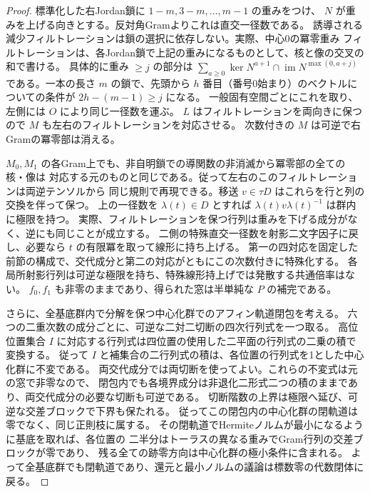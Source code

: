 \begin{proof}
標準化した右Jordan鎖に $1-m,3-m,\ldots,m-1$ の重みをつけ、
$N$ が重みを上げる向きとする。反対角Gramよりこれは直交一径数である。
誘導される減少フィルトレーションは鎖の選択に依存しない。実際、中心0の冪零重み
フィルトレーションは、各Jordan鎖で上記の重みになるものとして、核と像の交叉の和で書ける。
具体的に重み $\ge j$ の部分は $\sum_{a\ge0}\ker N^{a+1}\cap
\operatorname{im}N^{\max(0,a+j)}$ である。一本の長さ $m$ の鎖で、先頭から
$h$ 番目（番号0始まり）のベクトルについての条件が $2h-(m-1)\ge j$ になる。
一般固有空間ごとにこれを取り、左側には $O$ により同じ一径数を運ぶ。
$L$ はフィルトレーションを両向きに保つので $M$ も左右のフィルトレーションを対応させる。
次数付きの $M$ は可逆で右Gramの冪零部は消える。

$M_0,M_1$ の各Gram上でも、非自明鎖での導関数の非消滅から冪零部の全ての核・像は
対応する元のものと同じである。従って左右のこのフィルトレーションは両逆テンソルから
同じ規則で再現できる。移送 $v\in\tau D$ はこれらを行と列の交換を伴って保つ。
上の一径数を $\lambda(t)\in D$ とすれば $\lambda(t)v\lambda(t)^{-1}$ は群内に極限を持つ。
実際、フィルトレーションを保つ行列は重みを下げる成分がなく、逆にも同じことが成立する。
二側の特殊直交一径数を射影二文字因子に戻し、必要なら $t$ の有限冪を取って線形に持ち上げる。
第一の四対応を固定した前節の構成で、交代成分と第二の対応がともにこの次数付きに特殊化する。
各局所射影行列は可逆な極限を持ち、特殊線形持上げでは発散する共通倍率はない。
$f_0,f_1$ も非零のままであり、得られた窓は半単純な $P$ の補完である。

さらに、全基底群内で分解を保つ中心化群でのアフィン軌道閉包を考える。
六つの二重次数の成分ごとに、可逆な二対二切断の四次行列式を一つ取る。
高位位置集合 $I$ に対応する行列式は四位置の使用した二平面の行列式の二乗の積で変換する。
従って $I$ と補集合の二行列式の積は、各位置の行列式を1とした中心化群に不変である。
両交代成分では両切断を使ってよい。これらの不変式は元の窓で非零なので、
閉包内でも各境界成分は非退化二形式二つの積のままであり、両交代成分の必要な切断も可逆である。
切断階数の上界は極限へ延び、可逆な交差ブロックで下界も保たれる。
従ってこの閉包内の中心化群の閉軌道は零でなく、同じ正則枝に属する。
その閉軌道でHermiteノルムが最小になるように基底を取れば、各位置の
二半分はトーラスの異なる重みでGram行列の交差ブロックが零であり、
残る全ての跡零方向は中心化群の極小条件に含まれる。
よって全基底群でも閉軌道であり、還元と最小ノルムの議論は標数零の代数閉体に戻る。
\end{proof}
